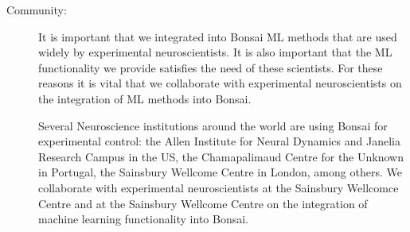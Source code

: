 \begin{description}
    \item[Community:] It is important that we integrated into Bonsai ML methods
        that are used widely by experimental neuroscientists. It is also
        important that the ML functionality we provide satisfies the need of
        these scientists. For these reasons it is vital that we collaborate
        with experimental neuroscientists on the integration of ML methods into
        Bonsai.

        Several Neuroscience institutions around the world are using Bonsai for
        experimental control: the Allen Institute for Neural Dynamics and
        Janelia Research Campus in the US, the Chamapalimaud Centre for the
        Unknown in Portugal, the Sainsbury Wellcome  Centre in London, among
        others. We collaborate with experimental neuroscientists at the
        Sainsbury Wellcomce Centre and at the Sainsbury Wellcome Centre on the
        integration of machine learning functionality into Bonsai.

\end{description}

